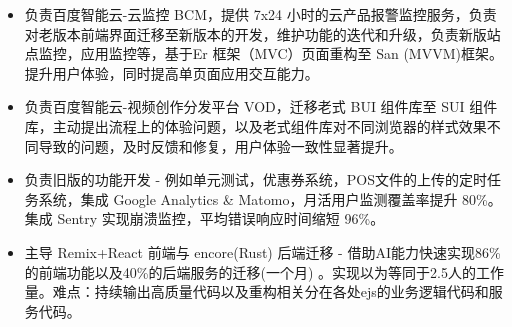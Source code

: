 \documentclass{resume}
\newcommand{\en}[1]{}
\newcommand{\zh}[1]{#1}
\begin{document}
\en{\datedsubsection{\textbf{\href{https://intl.cloud.baidu.com}{Baidu AI Cloud}}, Beijing, China}{01/2021 -- 08/2021}}
\zh{}
\en{\role{ACG Web Construction and Cloud Marketing Department}{Front-End Intern}}
\zh{}
\begin{itemize}
    \item \en{Led development of Baidu AI Cloud-BCM (24×7 cloud monitoring), migrating legacy front-end interfaces, iterating features, and delivering new site \& application monitoring modules. Refactored from Er (MVC) to San (MVVM), boosting UX and single-page interactivity.}
          \zh{负责百度智能云-云监控 BCM，提供 7x24 小时的云产品报警监控服务，负责对老版本前端界面迁移至新版本的开发，维护功能的迭代和升级，负责新版站点监控，应用监控等，基于Er 框架（MVC）页面重构至 San (MVVM)框架。提升用户体验，同时提高单页面应用交互能力。}
    \item \en{Owned Baidu AI Cloud-VOD (Video Creation \& Distribution) migration from legacy BUI to SUI, proactively addressing UX workflow issues and cross-browser style inconsistencies to deliver a markedly more consistent user experience.}
          \zh{负责百度智能云-视频创作分发平台 VOD，迁移老式 BUI 组件库至 SUI 组件库，主动提出流程上的体验问题，以及老式组件库对不同浏览器的样式效果不同导致的问题，及时反馈和修复，用户体验一致性显著提升。}
\end{itemize}

\en{\datedsubsection{\textbf{Absotlute IT}, Australia}{2024/01 -- Present}}
\zh{}
\en{\role{INDOS - Independent Online Solutions}{Full Stack Engineer}}
\zh{}
\begin{itemize}
    \item \en{Implemented legacy system features (EJS/Express), including unit tests, coupon system, scheduled POS file uploads, and Google Analytics \& Matomo integration, increasing monthly active user monitoring coverage by 80\%. Integrated Sentry for crash monitoring, reducing average error response time by 96\%.}
          \zh{负责旧版的功能开发 - 例如单元测试，优惠券系统，POS文件的上传的定时任务系统，集成 Google Analytics \& Matomo，月活用户监测覆盖率提升 80\%。集成 Sentry 实现崩溃监控，平均错误响应时间缩短 96\%。}
    \item \en{Led migration of front-end (Remix+React) and back-end (encore, Rust) from legacy stack, leveraging AI to accomplish 86\% of front-end and 40\% of back-end migration in one month, equivalent to 2.5 FTE. Challenges included consistently outputting high-quality code and refactoring scattered EJS business/service logic.}
          \zh{主导 Remix+React 前端与 encore(Rust) 后端迁移 - 借助AI能力快速实现86\%的前端功能以及40\%的后端服务的迁移(一个月) 。实现以为等同于2.5人的工作量。难点：持续输出高质量代码以及重构相关分在各处ejs的业务逻辑代码和服务代码。}
\end{itemize}
\end{document}
